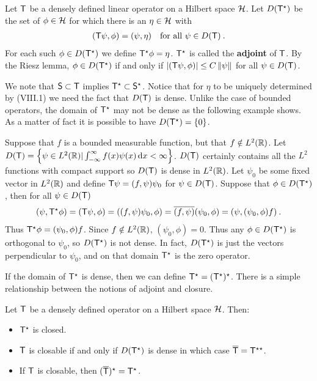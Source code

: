 \begin{definition}
Let $\mathsf{T}$ be a densely defined linear operator on a Hilbert space $\mathcal{H}$. Let $D(\mathsf{T}^\star)$ be the set of $\phi \in \mathcal{H}$ for which there is an $\eta \in \mathcal{H}$ with
\begin{align}
    (\mathsf{T} \psi, \phi) = (\psi, \eta) \quad \text{for all } \psi \in D(\mathsf{T}) \:.
\end{align}
For each such $\phi \in D(\mathsf{T}^\star)$ we define $\mathsf{T}^\star \phi = \eta$. $\mathsf{T}^\star$ is called the \textbf{adjoint} of $\mathsf{T}$. By the Riesz lemma, $\phi \in D(\mathsf{T}^\star)$ if and only if $|(\mathsf{T} \psi, \phi)| \leq C \left \Vert \psi \right \Vert$ for all $\psi \in D(\mathsf{T})$.
\end{definition}


We note that $\mathsf{S} \subset \mathsf{T}$ implies $\mathsf{T}^\star \subset \mathsf{S}^\star$. Notice that for $\eta$ to be uniquely determined by (VIII.1) we need the fact that $D(\mathsf{T})$ is dense. Unlike the case of bounded operators, the domain of $\mathsf{T}^\star$ may not be dense as the following example shows. As a matter of fact it is possible to have $D(\mathsf{T}^\star) = \left \lbrace 0 \right \rbrace$.

\begin{example}
Suppose that $f$ is a bounded measurable function, but that $f \notin L^{2}(\mathbb{R})$. Let $D(\mathsf{T}) = \left \lbrace \psi \in L^{2}(\mathbb{R}) | \int_{-\infty}^{\infty} f(x) \psi(x) \, \mathrm{d} x < \infty   \right \rbrace$. $D(\mathsf{T})$ certainly contains all the $L^2$ functions with compact support so $D(\mathsf{T})$ is dense in $L^{2}(\mathbb{R})$. Let $\psi_0$ be some fixed vector in $L^{2}(\mathbb{R})$ and define $\mathsf{T} \psi = (f, \psi) \psi_0$ for $\psi \in D(\mathsf{T})$. Suppose that $\phi \in D(\mathsf{T}^\star)$, then for all $\psi \in D(\mathsf{T})$
\begin{align}
    (\psi, \mathsf{T}^\star \phi) = (\mathsf{T} \psi, \phi) = ((f, \psi) \psi_0, \phi) = \overline{(f, \psi)} (\psi_0, \phi) = (\psi, (\psi_0, \phi) f) \:. 
\end{align}
Thus $\mathsf{T}^\star \phi = (\psi_0, \phi) f$. Since $f \notin L^{2}(\mathbb{R})$, $(\psi_0, \phi) = 0$. Thus any $\phi \in D(\mathsf{T}^\star)$ is orthogonal to $\psi_0$, so $D(\mathsf{T}^\star)$ is not dense. In fact, $D(\mathsf{T}^\star)$ is just the vectors perpendicular to $\psi_0$, and on that domain $\mathsf{T}^\star$ is the zero operator.
\end{example}

If the domain of $\mathsf{T}^\star$ is dense, then we can define $\mathsf{T}^\star = (\mathsf{T}^\star)^\star$. There is a simple relationship between the notions of adjoint and closure.

\begin{theorem}
Let $\mathsf{T}$ be a densely defined operator on a Hilbert space $\mathcal{H}$. Then:
\begin{itemize}
    \item $\mathsf{T}^\star$ is closed.
    \item $\mathsf{T}$ is closable if and only if $D(\mathsf{T}^\star)$ is dense in which case $\overline{\mathsf{T}} = \mathsf{T}^{\star \star}$.
    \item If $\mathsf{T}$ is closable, then $(\overline{\mathsf{T}})^\star = \mathsf{T}^\star$.
\end{itemize}

\end{theorem}

